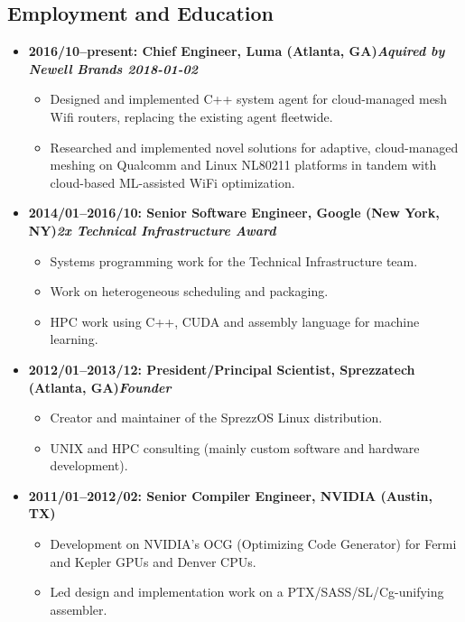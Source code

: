 \documentclass{article}
\newenvironment{tightitemize}
{\begin{itemize}
  \setlength{\itemsep}{1pt}
  \setlength{\parskip}{0pt}
  \setlength{\parsep}{0pt}}
{\end{itemize}}
\begin{document}
\subsection*{Employment and Education}
\begin{tightitemize}

\item \textbf{2016/10--present: Chief Engineer, Luma (Atlanta, GA)\hfill \tiny{\textit{Aquired by Newell Brands 2018-01-02}}}
\begin{tightitemize}
\item Designed and implemented C++ system agent for cloud-managed mesh
	Wifi routers, replacing the existing agent fleetwide.
\item Researched and implemented novel solutions for adaptive, cloud-managed
	meshing on Qualcomm and Linux NL80211 platforms in tandem with
	cloud-based ML-assisted WiFi optimization.
\end{tightitemize}

\item \textbf{2014/01--2016/10: Senior Software Engineer, Google (New York, NY)\hfill \tiny{\textit{2x Technical Infrastructure Award}}}
\begin{tightitemize}
\item Systems programming work for the Technical Infrastructure team.
\item Work on heterogeneous scheduling and packaging.
\item HPC work using C++, CUDA and assembly language for machine learning.
\end{tightitemize}

\item \textbf{2012/01--2013/12: President/Principal Scientist, Sprezzatech (Atlanta, GA)\hfill \tiny{\textit{Founder}}}
\begin{tightitemize}
\item Creator and maintainer of the SprezzOS Linux distribution.
\item UNIX and HPC consulting (mainly custom software and hardware development).
\end{tightitemize}

\item \textbf{2011/01--2012/02: Senior Compiler Engineer, NVIDIA (Austin, TX)}
\begin{tightitemize}
\item Development on NVIDIA's OCG (Optimizing Code Generator) for Fermi and Kepler GPUs and Denver CPUs.
\item Led design and implementation work on a PTX/SASS/SL/Cg-unifying assembler.
\end{tightitemize}


\end{tightitemize}
\end{document}
